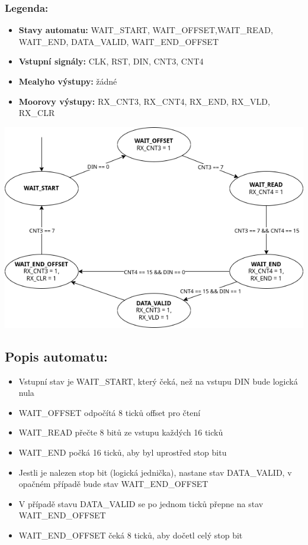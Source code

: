 \documentclass{article}
\begin{document}
	\subsubsection{Legenda:}
	\begin{itemize}
		\item \textbf{Stavy automatu:} WAIT\_START, WAIT\_OFFSET,WAIT\_READ,
				WAIT\_END, DATA\_VALID, WAIT\_END\_OFFSET
		\item \textbf{Vstupní signály:} CLK, RST, DIN, CNT3, CNT4
		\item \textbf{Mealyho výstupy:} žádné
		\item \textbf{Moorovy výstupy:} RX\_CNT3, RX\_CNT4, RX\_END,
				RX\_VLD, RX\_CLR
	\end{itemize}

	\includegraphics[scale=0.69]{./src/automat.png}

	\subsection{Popis automatu:}
	\begin{itemize}
		\item Vstupní stav je WAIT\_START, který čeká, než na vstupu DIN 
				bude logická nula
		\item WAIT\_OFFSET odpočítá 8 ticků offset pro čtení
		\item WAIT\_READ přečte 8 bitů ze vstupu každých 16 ticků
		\item WAIT\_END počká 16 ticků, aby byl uprostřed stop bitu
		\item Jestli je nalezen stop bit (logická jednička), nastane 
				stav DATA\_VALID, v opačném případě bude stav 
				WAIT\_END\_OFFSET
		\item V případě stavu DATA\_VALID se po jednom ticků přepne 
				na stav WAIT\_END\_OFFSET
		\item WAIT\_END\_OFFSET čeká 8 ticků, aby dočetl celý stop bit
	\end{itemize}
\end{document}
